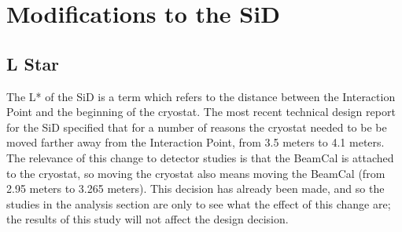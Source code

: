 \documentclass{report}
\begin{document}
        \section{Modifications to the SiD} \label{sect:sid_mods}
            \subsection{L Star}

                The L* of the SiD is a term which refers to the distance between the Interaction Point and the beginning of the cryostat. The most recent technical design report for the SiD specified that for a number of reasons the cryostat needed to be be moved farther away from the Interaction Point, from 3.5 meters to 4.1 meters. The relevance of this change to detector studies is that the BeamCal is attached to the cryostat, so moving the cryostat also means moving the BeamCal (from 2.95 meters to 3.265 meters). This decision has already been made, and so the studies in the analysis section are only to see what the effect of this change are; the results of this study will not affect the design decision.


\end{document}
